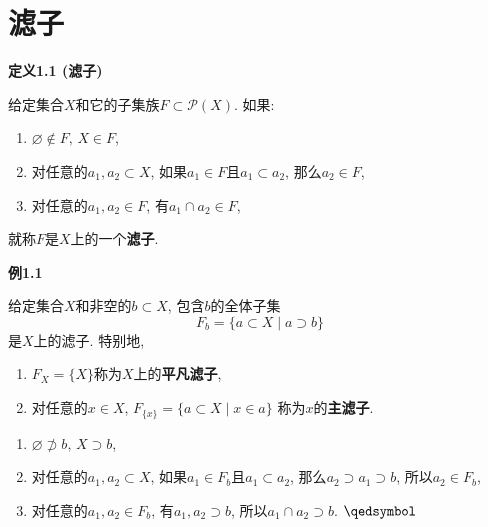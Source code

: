 


\setlength{\abovedisplayskip}{1pt}
\setlength{\belowdisplayskip}{1pt}

\section{滤子}



\hypertarget{sec:定义1.1}{}
\noindent\textbf{定义1.1 (滤子)}

给定集合$X$和它的子集族$F\subset\mathcal{P}(X)$. 如果:
\begin{enumerate}
    \item $\varnothing\notin F,\,X\in F$,
    \item 对任意的$a_1,a_2\subset X$, 如果$a_1\in F$且$a_1\subset a_2$,
    那么$a_2\in F$,
    \item 对任意的$a_1,a_2\in F$, 有$a_1\cap a_2\in F$,
\end{enumerate}
就称$F$是$X$上的一个\textbf{滤子}.




\vspace{10pt}

\hypertarget{sec:例1.1}{}
\noindent\textbf{例1.1}

给定集合$X$和非空的$b\subset X$, 包含$b$的全体子集
\[
    F_b=\{a\subset X\mid a\supset b\}
\]
是$X$上的滤子. 特别地,
\begin{enumerate}
    \item $F_X=\{X\}$称为$X$上的\textbf{平凡滤子},
    \item 对任意的$x\in X$, $F_{\{x\}}=\{a\subset X\mid x\in a\}$
    称为$x$的\textbf{主滤子}.
\end{enumerate}


\begin{enumerate}
    \item $\varnothing\not\supset b,\,X\supset b$,
    \item 对任意的$a_1,a_2\subset X$, 如果$a_1\in F_b$且$a_1\subset a_2$,
    那么$a_2\supset a_1\supset b$, 所以$a_2\in F_b$,
    \item 对任意的$a_1,a_2\in F_b$, 有$a_1,a_2\supset b$,
    所以$a_1\cap a_2\supset b$. \hfill $\qedsymbol$
\end{enumerate}

